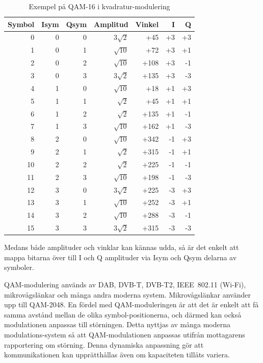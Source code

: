 \begin{table}[ht]
\begin{center}
\begin{tabular}{|r|r|r|r|r|r|r|}
\hline
Symbol & Isym & Qsym & Amplitud      & Vinkel &  I &   Q \\ \hline
     0 &    0 &    0 & \(3\sqrt{2}\) &    +45 & +3 &  +3 \\
     1 &    0 &    1 & \(\sqrt{10}\) &    +72 & +3 &  +1 \\
     2 &    0 &    2 & \(\sqrt{10}\) &   +108 & +3 &  -1 \\
     3 &    0 &    3 & \(3\sqrt{2}\) &   +135 & +3 &  -3 \\
     4 &    1 &    0 & \(\sqrt{10}\) &    +18 & +1 &  +3 \\
     5 &    1 &    1 &  \(\sqrt{2}\) &    +45 & +1 &  +1 \\
     6 &    1 &    2 &  \(\sqrt{2}\) &   +135 & +1 &  -1 \\
     7 &    1 &    3 & \(\sqrt{10}\) &   +162 & +1 &  -3 \\
     8 &    2 &    0 & \(\sqrt{10}\) &   +342 & -1 &  +3 \\
     9 &    2 &    1 &  \(\sqrt{2}\) &   +315 & -1 &  +1 \\
    10 &    2 &    2 &  \(\sqrt{2}\) &   +225 & -1 &  -1 \\
    11 &    2 &    3 & \(\sqrt{10}\) &   +198 & -1 &  -3 \\
    12 &    3 &    0 & \(3\sqrt{2}\) &   +225 & -3 &  +3 \\
    13 &    3 &    1 & \(\sqrt{10}\) &   +252 & -3 &  +1 \\
    14 &    3 &    2 & \(\sqrt{10}\) &   +288 & -3 &  -1 \\
    15 &    3 &    3 & \(3\sqrt{2}\) &   +315 & -3 &  -3 \\ \hline
\end{tabular}
\end{center}
\caption{Exempel på QAM-16 i kvadratur-modulering}
\label{tab:QAM-16}
\end{table}

Medans både amplituder och vinklar kan kännas udda, så är det enkelt att
mappa bitarna över till I och Q amplituder via Isym och Qsym delarna av
symboler.

QAM-modulering används av DAB, DVB-T, DVB-T2, IEEE~802.11 (Wi-Fi),
mikrovågslänkar och många andra moderna system.
Mikrovågslänkar använder upp till QAM-2048.
En fördel med QAM-moduleringen är att det är enkelt att få samma avstånd
mellan de olika symbol-positionerna, och därmed kan också modulationen anpassas
till störningen. Detta nyttjas av många moderna modulations-system så att
QAM-modulationen anpassas utifrån mottagarens rapportering om störning.
Denna dynamiska anpassning gör att kommunikationen kan upprätthållas även om
kapaciteten tillåts variera.

